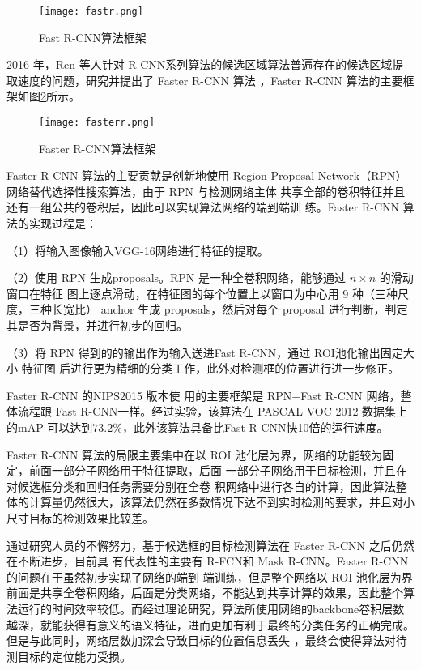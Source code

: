 \begin{figure}[htbp]
    \centering
    \texttt{[image: fastr.png]}
    \caption{Fast R-CNN算法框架}
    \label{fastr}
\end{figure}

2016 年，Ren 等人针对 R-CNN系列算法的候选区域算法普遍存在的候选区域提取速度的问题，研究并提出了 Faster R-CNN 算法
\cite{ren2015faster}，Faster R-CNN 算法的主要框架如图\ref{fasterr}所示。

\begin{figure}[htbp]
    \centering
    \texttt{[image: fasterr.png]}
    \caption{Faster R-CNN算法框架}
    \label{fasterr}
\end{figure}

Faster R-CNN 算法的主要贡献是创新地使用 Region
Proposal Network（RPN）网络替代选择性搜索算法，由于 RPN 与检测网络主体
共享全部的卷积特征并且还有一组公共的卷积层，因此可以实现算法网络的端到端训
练。Faster R-CNN 算法的实现过程是：

（1）将输入图像输入VGG-16网络进行特征的提取。

（2）使用 RPN 生成proposals。RPN 是一种全卷积网络，能够通过 $n \times n$ 的滑动窗口在特征
图上逐点滑动，在特征图的每个位置上以窗口为中心用 9 种（三种尺度，三种长宽比）
anchor 生成 proposals，然后对每个 proposal 进行判断，判定其是否为背景，并进行初步的回归。

（3）将 RPN 得到的的输出作为输入送进Fast R-CNN，通过 ROI池化输出固定大小 特征图 后进行更为精细的分类工作，此外对检测框的位置进行进一步修正。

Faster R-CNN 的NIPS2015 版本使
用的主要框架是 RPN+Fast R-CNN 网络，整体流程跟 Fast R-CNN一样。经过实验，该算法在 PASCAL VOC 2012 数据集上的mAP 可以达到$73.2\%$，此外该算法具备比Fast R-CNN快10倍的运行速度。

Faster R-CNN 算法的局限主要集中在以 ROI 池化层为界，网络的功能较为固定，前面一部分子网络用于特征提取，后面
一部分子网络用于目标检测，并且在对候选框分类和回归任务需要分别在全卷
积网络中进行各自的计算，因此算法整体的计算量仍然很大，该算法仍然在多数情况下达不到实时检测的要求，并且对小尺寸目标的检测效果比较差。

通过研究人员的不懈努力，基于候选框的目标检测算法在 Faster R-CNN 之后仍然在不断进步，目前具
有代表性的主要有 R-FCN\cite{dai2016r}和 Mask R-CNN\cite{he2017mask}。Faster R-CNN 的问题在于虽然初步实现了网络的端到
端训练，但是整个网络以 ROI 池化层为界前面是共享全卷积网络，后面是分类网络，不能达到共享计算的效果，因此整个算
法运行的时间效率较低。而经过理论研究，算法所使用网络的backbone卷积层数越深，就能获得有意义的语义特征，进而更加有利于最终的分类任务的正确完成。但是与此同时，网络层数加深会导致目标的位置信息丢失
，最终会使得算法对待测目标的定位能力受损。

